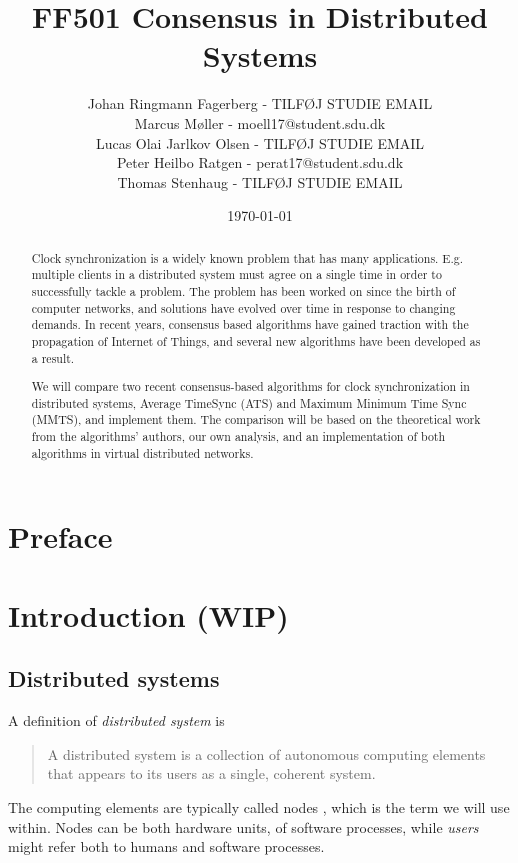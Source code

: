 \documentclass[a4paper,12pt]{article}
\date{\today}
\title{FF501 Consensus in Distributed Systems}
\author{
  Johan Ringmann Fagerberg - TILFØJ STUDIE EMAIL\\
  Marcus Møller - moell17@student.sdu.dk \\
  Lucas Olai Jarlkov Olsen - TILFØJ STUDIE EMAIL\\
  Peter Heilbo Ratgen - perat17@student.sdu.dk\\
  Thomas Stenhaug - TILFØJ STUDIE EMAIL
}
\begin{document}
\maketitle

\setlength{\baselineskip}{1.44\baselineskip}

\begin{abstract}

Clock synchronization is a widely known problem that has many applications. E.g. multiple clients in a distributed system must agree on a single time in order to successfully tackle a problem. The problem has been worked on since the birth of computer networks, and solutions have evolved over time in response to changing demands. In recent years, consensus based algorithms have gained traction with the propagation of Internet of Things, and several new algorithms have been developed as a result.

We will compare two recent consensus-based algorithms for clock synchronization in distributed systems, Average TimeSync (ATS) and Maximum Minimum Time Sync (MMTS), and implement them. The comparison will be based on the theoretical work from the algorithms' authors, our own analysis, and an implementation of both algorithms in virtual distributed networks.
\end{abstract}

\clearpage
\tableofcontents
\clearpage

\setcounter{page}{1}

\section{Preface}

\section{Introduction (WIP)}

\subsection{Distributed systems}

A definition of \textit{distributed system} is
\begin{quote}
  A distributed system is a collection of autonomous computing
  elements that appears to its users as a single, coherent
  system.\citet{TanenbaumSteen06}
\end{quote}

The computing elements are typically called
nodes \citet{TanenbaumSteen06}, which is the term we will use within.
Nodes can be both hardware units, of software processes, while
\textit{users} might refer both to humans and software processes.
\end{document}
